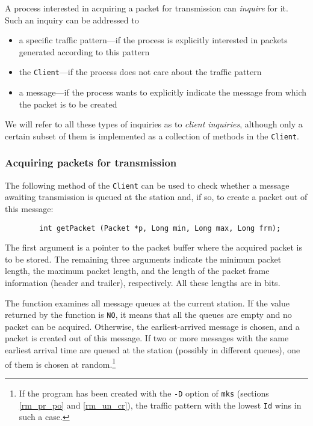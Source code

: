 A process interested in acquiring a packet for transmission can {\em inquire\/}
for it.
Such an inquiry can be addressed to
\begin{itemize}
\item
a specific traffic pattern---if the process
is explicitly interested in packets generated according to this pattern
\item
the {\tt Client}---if the process does not care about the traffic
pattern
\item
a message---if the process wants to explicitly indicate the message from
which the packet is to be created
\end{itemize}
\noindent
We will refer to all these types of inquiries as to {\em client inquiries},
although only a certain subset of them is implemented as a collection of
methods in the {\tt Client}.

\subsubsection{Acquiring packets for transmission}
\label{rm_cl_in_ap}

The following method of the {\tt Client} can be used to check whether a
message awaiting transmission is queued at the station and, if so, to 
create a packet out of this message:
\begin{verbatim}
        int getPacket (Packet *p, Long min, Long max, Long frm);
\end{verbatim}

\noindent
The first argument is a pointer to the packet buffer where
the acquired packet is to be stored.
The remaining three arguments indicate the minimum packet length,
the maximum packet length, and the length of the packet frame information
(header and trailer), respectively.
All these lengths are in bits.

The function examines all message queues at the current station.
If the value returned by the function is {\tt NO},
it means that all the queues are empty and no packet can be acquired.
Otherwise, the earliest-arrived message is chosen, and a packet is created
out of this message.
If two or more messages with the same earliest arrival time are queued at
the station (possibly in different queues),
one of them is chosen at random.\footnote{If the program has been created
with the {\tt -D} option of {\tt mks} (sections \ref{rm_pr_po}
and \ref{rm_un_cr}), the traffic pattern with the lowest {\tt Id} wins in
such a case.}

